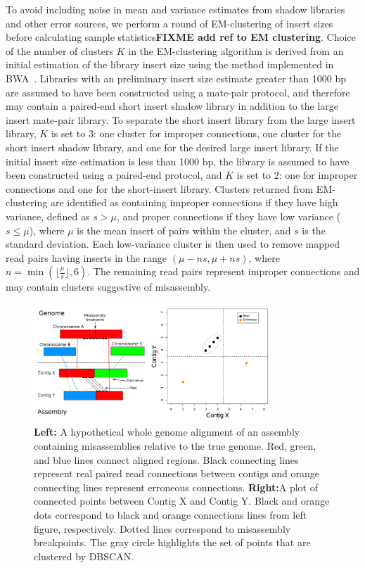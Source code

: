 \documentclass{bioinfo}
\begin{document}
To avoid including noise in mean and variance estimates from shadow libraries and other error sources, 
we perform a round of EM-clustering of insert sizes before calculating sample statistics\textbf{FIXME add ref to EM clustering}. Choice of 
the number of clusters $K$ in
the EM-clustering algorithm is derived from an initial estimation of the library insert size using the method implemented in
BWA~\citep{bwa}. Libraries with an preliminary
insert size estimate greater than 1000 bp are assumed to have been constructed using a mate-pair protocol, and therefore
may contain a paired-end short insert shadow library in addition to the large insert mate-pair library. To separate the short insert library
from the large insert library, $K$ is set to 3: one cluster for improper connections, one cluster for the short insert
shadow library, and one for the desired large insert library. If the initial insert size estimation is less than 1000 bp, the library
is assumed to have been constructed using a paired-end protocol, and $K$ is set to 2: one for improper connections
and one for the short-insert library. Clusters returned from EM-clustering are identified as containing improper connections if 
they have high variance, defined as $s > \mu$, and proper connections if they have low variance ($s \le \mu$), where $\mu$ is the mean insert of pairs within
the cluster, and $s$ is the standard deviation. Each low-variance cluster is then used to remove mapped read pairs 
 having inserts in the range $(\mu-ns,\mu+ns)$, where $n = \min(\lfloor\frac{\mu}{s}\rfloor, 6)$.  The remaining read
pairs represent improper connections and may contain clusters suggestive of misassembly.


\begin{figure}[t]
\includegraphics[width=3.5in]{fish-qc.pdf}
\vspace{-1cm}
\caption{\textbf{Left:}  A hypothetical whole genome alignment of an assembly containing misassemblies relative to the true genome. 
Red, green, and blue lines connect aligned regions. Black connecting lines represent real paired read 
connections between contigs and orange connecting lines represent erroneous connections. \textbf{Right:}A plot 
of connected points between Contig X and Contig Y. Black and orange dots correspond
to black and orange connections lines from left figure, respectively. Dotted lines correspond
to misassembly breakpoints. The gray circle highlights the set of points that are clustered by DBSCAN. }\label{fig:02}
\end{figure}
\end{document}
